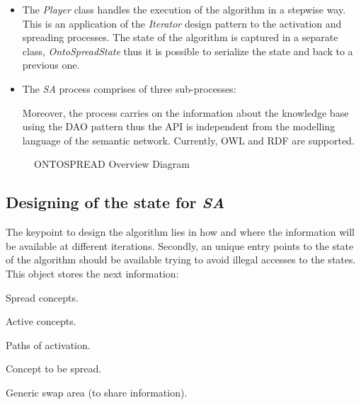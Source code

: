 \documentclass{llncs}
\begin{document}
\begin{itemize}

\item The \textit{Player} class handles the execution of the algorithm in a
      stepwise way. This is an application of the \textit{Iterator}
      design pattern to the activation and spreading processes. The state
      of the algorithm is captured in a separate class,
      \textit{OntoSpreadState} thus it is possible to serialize the
      state and back to a previous one.

\item The \textit{SA} process comprises of three sub-processes: 

Moreover, the process carries on the information about the knowledge base using the DAO
pattern thus the API is independent from the modelling language of the semantic network. Currently, OWL
and RDF are supported.
\end{itemize}


\begin{figure}[htb]
\centering
\caption{ONTOSPREAD Overview Diagram}
\label{fig:diagramas/general}
\end{figure}

\subsection{Designing of the state for \textit{SA}}
The keypoint to design the algorithm lies in how and where
the information will be available at different iterations. Secondly, an unique entry points
to the state of the algorithm should be available trying to avoid
illegal accesses to the states. This object stores the next information: \begin{inparaenum}\item Spread
concepts. \item Active concepts. \item Paths of activation. \item Concept to be
spread. \item Generic swap area (to share information). \end{inparaenum}
\end{document}
